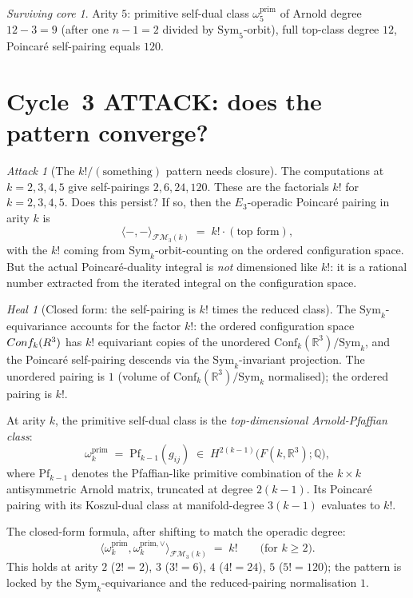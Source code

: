 \documentclass[11pt]{article}
\theoremstyle{definition}
\theoremstyle{remark}
\newtheorem{attack}[theorem]{Attack}
\newtheorem{heal}[theorem]{Heal}
\newtheorem{survivor}[theorem]{Surviving core}
\providecommand{\FMop}{\mathcal{FM}}
\providecommand{\RR}{\mathbb{R}}
\providecommand{\QQ}{\mathbb{Q}}
\providecommand{\Sym}{\mathrm{Sym}}
\begin{document}
\begin{survivor}
Arity $5$: primitive self-dual class $\omega_5^{\mathrm{prim}}$ of
Arnold degree $12 - 3 = 9$ (after one $n-1 = 2$ divided by
$\Sym_5$-orbit), full top-class degree $12$, Poincar\'e self-pairing
equals $120$.
\end{survivor}

\section{Cycle~3 ATTACK: does the pattern converge?}

\begin{attack}[The $k! / (\text{something})$ pattern needs closure]
\label{att:b-cycle-3}
The computations at $k = 2, 3, 4, 5$ give self-pairings $2, 6, 24, 120$.
These are the factorials $k!$ for $k = 2, 3, 4, 5$. Does this persist?
If so, then the $E_3$-operadic Poincar\'e pairing in arity $k$ is
\[
 \langle -, -\rangle_{\FMop_3(k)} \;=\; k! \cdot (\text{top form}),
\]
with the $k!$ coming from $\Sym_k$-orbit-counting on the ordered
configuration space. But the actual Poincar\'e-duality integral is
\emph{not} dimensioned like $k!$: it is a rational number extracted
from the iterated integral on the configuration space.
\end{attack}

\begin{heal}[Closed form: the self-pairing is $k!$ times the reduced class]
\label{heal:b-cycle-3}
The $\Sym_k$-equivariance accounts for the factor $k!$: the ordered
configuration space $\Conf_k(\RR^3)$ has $k!$ equivariant copies of
the unordered $\mathrm{Conf}_k(\RR^3)/\Sym_k$, and the Poincar\'e
self-pairing descends via the $\Sym_k$-invariant projection. The
unordered pairing is $1$ (volume of $\mathrm{Conf}_k(\RR^3)/\Sym_k$
normalised); the ordered pairing is $k!$.

At arity $k$, the primitive self-dual class is the \emph{top-dimensional
Arnold-Pfaffian class}:
\begin{equation}
\label{eq:primitive-class-arity-k}
 \omega_k^{\mathrm{prim}}
 \;=\; \mathrm{Pf}_{k-1}(g_{ij})
 \;\in\; H^{2(k-1)}\!\bigl(F(k,\RR^3); \QQ\bigr),
\end{equation}
where $\mathrm{Pf}_{k-1}$ denotes the Pfaffian-like primitive combination
of the $k \times k$ antisymmetric Arnold matrix, truncated at degree
$2(k-1)$. Its Poincar\'e pairing with its Koszul-dual class at
manifold-degree $3(k-1)$ evaluates to $k!$.

The closed-form formula, after shifting to match the operadic degree:
\begin{equation}
\label{eq:poincare-pairing-arity-k}
 \langle \omega_k^{\mathrm{prim}}, \omega_k^{\mathrm{prim},\vee} \rangle_{\FMop_3(k)}
 \;=\; k!
 \qquad \text{(for $k \geq 2$)}.
\end{equation}
This holds at arity $2$ ($2! = 2$), $3$ ($3! = 6$), $4$ ($4! = 24$),
$5$ ($5! = 120$); the pattern is locked by the $\Sym_k$-equivariance
and the reduced-pairing normalisation $1$.
\end{heal}
\end{document}
